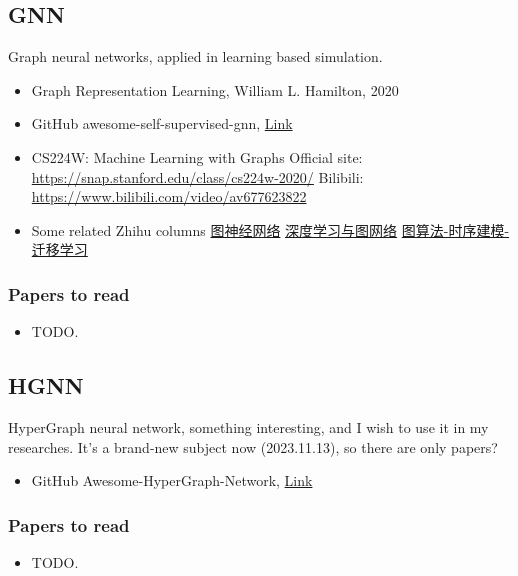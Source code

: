 \documentclass{article}
\begin{document}
\subsection{GNN}
\par Graph neural networks, applied in learning based simulation.
\begin{itemize}
    \item Graph Representation Learning, William L. Hamilton, 2020
    \item GitHub awesome-self-supervised-gnn, \href{https://github.com/ChandlerBang/awesome-self-supervised-gnn}{Link}
    \item CS224W: Machine Learning with Graphs \newline Official site: \href{https://snap.stanford.edu/class/cs224w-2020/}{https://snap.stanford.edu/class/cs224w-2020/} \newline Bilibili: \href{https://www.bilibili.com/video/av677623822}{https://www.bilibili.com/video/av677623822}
    \item Some related Zhihu columns \newline \href{https://www.zhihu.com/column/c_1330471030893662208}{图神经网络} \newline \href{https://www.zhihu.com/column/marlin}{深度学习与图网络} \newline \href{https://www.zhihu.com/column/c_1115285924917047296}{图算法-时序建模-迁移学习}
\end{itemize}
\subsubsection{Papers to read}
\begin{itemize}
    \item TODO.
\end{itemize}
\subsection{HGNN}
\par HyperGraph neural network, something interesting, and I wish to use it in my researches. It's a brand-new subject now (2023.11.13), so there are only papers?
\begin{itemize}
    \item GitHub Awesome-HyperGraph-Network, \href{https://github.com/gzcsudo/Awesome-Hypergraph-Network}{Link}
\end{itemize}
\subsubsection{Papers to read}
\begin{itemize}
    \item TODO.
\end{itemize}
\end{document}
